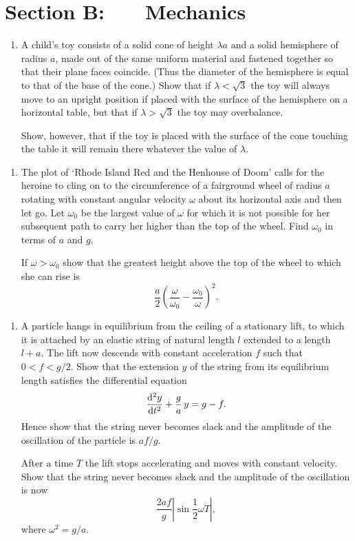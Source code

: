 \documentclass[a4, 11pt]{report}
\newlength{\qspace}
\newcounter{qnumber}
\newenvironment{question}%
 {\vspace{\qspace}
  \begin{enumerate}[\bfseries 1\quad][10]%
    \setcounter{enumi}{\value{qnumber}}%
    \item%
 }
{
  \end{enumerate}
  \filbreak
  \stepcounter{qnumber}
 }
\begin{document}
		
	
\newpage
\section*{Section B: \ \ \ Mechanics}


	
\begin{question}
A child's toy consists of a  solid cone
of height $\lambda a$ and a 
solid hemisphere
of radius $a$,
made out of the same uniform material and fastened together
so that their plane faces coincide. (Thus the diameter
of the hemisphere is equal to that of the base of the cone.)
Show that if 
$\lambda<\sqrt{3}$ the toy will always move to an upright
position if placed with the surface of the hemisphere on a
horizontal table, but that if
$\lambda>\sqrt{3}$ the toy may overbalance.

Show, however, that if the toy is placed with the surface of the cone
touching the table it will remain there whatever the value of $\lambda$.

	\end{question}
	
\begin{question}	
The plot of `Rhode Island Red and the Henhouse of Doom' calls
for the heroine to cling on to the circumference of a
fairground wheel of radius $a$ rotating with constant angular
velocity $\omega$ about its horizontal axis
and then let go. Let $\omega_{0}$ be the largest value
of $\omega$ for which it is not possible for her subsequent
path to carry her higher than the top
of the wheel. Find $\omega_{0}$ in terms of $a$ and $g$.

If $\omega>\omega_{0}$ show that the greatest height
above          the top of the wheel to which she
can rise is
\[\frac{a}{2}\left(\frac{\omega}{\omega_{0}}
-\frac{\omega_{0}}{\omega}\right)^{\!\!2}.\]
\end{question}


\begin{question}
A particle hangs in equilibrium from the ceiling
of a stationary lift, to which it is attached by an elastic
string of natural length $l$ extended to a length $l+a$.
The lift now descends with constant acceleration $f$
such that $0<f<g/2$. Show that the extension $y$ of the
string from its equilibrium length satisfies the 
differential equation 
$$
{{\rm  d}^2 y \over {\rm d} t^2}  +{g \over a}\, y = g-f.
$$
Hence show that 
the string never becomes slack and the
amplitude of the oscillation of the particle is $af/g$.

After a time $T$ the lift stops accelerating and moves with constant
velocity. Show that the string never becomes slack
and the amplitude of the oscillation is now
\[\frac{2af}{g}|\sin {\textstyle \frac{1}{2}}\omega T|,\]
where $\omega^{2}=g/a$.
\end{question}
	
\end{document}
